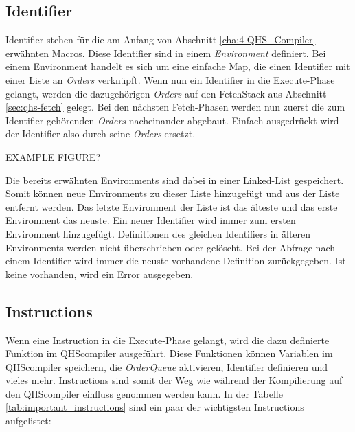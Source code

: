 \subsection{Identifier}
Identifier stehen für die am Anfang von Abschnitt \ref{cha:4-QHS_Compiler} erwähnten Macros. Diese Identifier sind in einem \textit{Environment} definiert.
Bei einem Environment handelt es sich um eine einfache Map, die einen Identifier mit einer Liste an \textit{Orders} verknüpft.
Wenn nun ein Identifier in die Execute-Phase gelangt, werden die dazugehörigen \textit{Orders} auf den FetchStack aus Abschnitt \ref{sec:qhs-fetch} gelegt.
Bei den nächsten Fetch-Phasen werden nun zuerst die zum Identifier gehörenden \textit{Orders} nacheinander abgebaut. Einfach ausgedrückt wird der Identifier also durch seine \textit{Orders} ersetzt.

EXAMPLE FIGURE?

Die bereits erwähnten Environments sind dabei in einer Linked-List gespeichert. Somit können neue Environments zu dieser Liste hinzugefügt und aus der Liste entfernt werden.
Das letzte Environment der Liste ist das älteste und das erste Environment das neuste.
Ein neuer Identifier wird immer zum ersten Environment hinzugefügt. Definitionen des gleichen Identifiers in älteren Environments werden nicht überschrieben oder gelöscht.
Bei der Abfrage nach einem Identifier wird immer die neuste vorhandene Definition zurückgegeben. Ist keine vorhanden, wird ein Error ausgegeben.

\subsection{Instructions}
Wenn eine Instruction in die Execute-Phase gelangt, wird die dazu definierte Funktion im QHScompiler ausgeführt.
Diese Funktionen können Variablen im QHScompiler speichern, die \textit{OrderQueue} aktivieren, Identifier definieren und vieles mehr. Instructions sind somit der Weg wie während der Kompilierung auf den QHScompiler einfluss genommen werden kann.
In der Tabelle \ref{tab:important_instructions} sind ein paar der wichtigsten Instructions aufgelistet:

